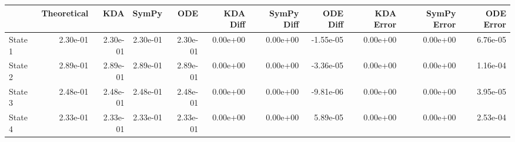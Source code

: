\begin{tabular}{lrrrrrrrrrr}
\toprule
{} &  Theoretical &      KDA &    SymPy &      ODE &  KDA Diff &  SymPy Diff &  ODE Diff &  KDA Error &  SymPy Error &  ODE Error \\
\midrule
State 1 &     2.30e-01 & 2.30e-01 & 2.30e-01 & 2.30e-01 &  0.00e+00 &    0.00e+00 & -1.55e-05 &   0.00e+00 &     0.00e+00 &   6.76e-05 \\
State 2 &     2.89e-01 & 2.89e-01 & 2.89e-01 & 2.89e-01 &  0.00e+00 &    0.00e+00 & -3.36e-05 &   0.00e+00 &     0.00e+00 &   1.16e-04 \\
State 3 &     2.48e-01 & 2.48e-01 & 2.48e-01 & 2.48e-01 &  0.00e+00 &    0.00e+00 & -9.81e-06 &   0.00e+00 &     0.00e+00 &   3.95e-05 \\
State 4 &     2.33e-01 & 2.33e-01 & 2.33e-01 & 2.33e-01 &  0.00e+00 &    0.00e+00 &  5.89e-05 &   0.00e+00 &     0.00e+00 &   2.53e-04 \\
\bottomrule
\end{tabular}
